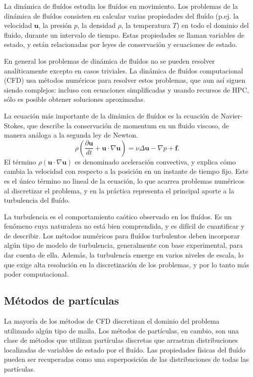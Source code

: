 \documentclass[11pt,spanish]{article}
\newcommand{\vel}{\mathbf{u}}
\begin{document}
La dinámica de fluídos estudia los fluídos en movimiento.  Los problemas de la
dinámica de fluídos consisten en calcular varias propiedades del fluído (p.ej.
la velocidad $\vel$, la presión $p$, la densidad $\rho$, la temperatura $T$) en
todo el dominio del fluido, durante un intervalo de tiempo.  Estas propiedades
se llaman variables de estado, y están relacionadas por leyes de conservación y
ecuaciones de estado.

En general los problemas de dinámica de fluídos no se pueden resolver
analíticamente excepto en casos triviales.  La dinámica de fluídos computacional
(CFD) usa métodos numéricos para resolver estos problemas, que aun así siguen
siendo complejos:  incluso con ecuaciones simplificadas y usando recursos de
HPC, sólo es posible obtener soluciones aproximadas.

La ecuación más importante de la dinámica de fluídos es la ecuación de
Navier-Stokes, que describe la conservación de momentum en un fluido viscoso,
de manera análoga a la segunda ley de Newton.  
\begin{equation}
    \rho\left(\frac{\partial\vel}{dt} + \vel\cdot\nabla\vel \right) =
    \nu\Delta\vel - \nabla p + \mathbf{f}.
\end{equation}
El término $\rho(\vel\cdot\nabla\vel)$ es denominado aceleración convectiva, y
explica cómo cambia la velocidad con respecto a la posición en un instante de
tiempo fijo.  Este es el único término no lineal de la ecuación, lo que acarrea
problemas numéricos al discretizar el problema, y en la práctica representa el
principal aporte a la turbulencia del fluído.

La turbulencia es el comportamiento caótico observado en los fluídos.  Es un
fenómeno cuya naturaleza no está bien comprendida, y es difícil de cuantificar y
de describir.  Los métodos numéricos para fluídos turbulentos deben incorporar
algún tipo de modelo de turbulencia, generalmente con base experimental, para
dar cuenta de ella.  Además, la turbulencia emerge en varios niveles de escala,
lo que exige alta resolución en la discretización de los problemas, y por lo
tanto más poder computacional.

\subsection{Métodos de partículas}
La mayoría de los métodos de CFD discretizan el dominio del problema utilizando
algún tipo de malla.  Los métodos de partículas, en cambio, son una clase
de métodos que utilizan partículas discretas que arrastran distribuciones
localizadas de variables de estado por el fluído.  Las propiedades físicas del
fluído pueden ser recuperadas como una superposición de las distribuciones
de todas las partículas.
\end{document}
